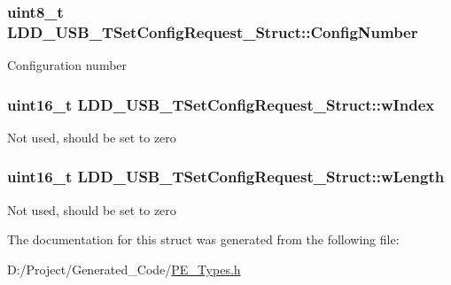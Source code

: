\subsubsection[{Config\+Number}]{\setlength{\rightskip}{0pt plus 5cm}uint8\+\_\+t L\+D\+D\+\_\+\+U\+S\+B\+\_\+\+T\+Set\+Config\+Request\+\_\+\+Struct\+::\+Config\+Number}\label{struct_l_d_d___u_s_b___t_set_config_request___struct_a9a545d7858a7ee85dbe37eaf2b4b7e01}
Configuration number \hypertarget{struct_l_d_d___u_s_b___t_set_config_request___struct_ad2aa2851b128777e842b2ac796d2f664}{}
\subsubsection[{w\+Index}]{\setlength{\rightskip}{0pt plus 5cm}uint16\+\_\+t L\+D\+D\+\_\+\+U\+S\+B\+\_\+\+T\+Set\+Config\+Request\+\_\+\+Struct\+::w\+Index}\label{struct_l_d_d___u_s_b___t_set_config_request___struct_ad2aa2851b128777e842b2ac796d2f664}
Not used, should be set to zero \hypertarget{struct_l_d_d___u_s_b___t_set_config_request___struct_a66312977eb5816459d0201a2bacaf9b5}{}
\subsubsection[{w\+Length}]{\setlength{\rightskip}{0pt plus 5cm}uint16\+\_\+t L\+D\+D\+\_\+\+U\+S\+B\+\_\+\+T\+Set\+Config\+Request\+\_\+\+Struct\+::w\+Length}\label{struct_l_d_d___u_s_b___t_set_config_request___struct_a66312977eb5816459d0201a2bacaf9b5}
Not used, should be set to zero 

The documentation for this struct was generated from the following file\+:\begin{DoxyCompactItemize}
\item 
D\+:/\+Project/\+Generated\+\_\+\+Code/\hyperlink{_p_e___types_8h}{P\+E\+\_\+\+Types.\+h}\end{DoxyCompactItemize}
